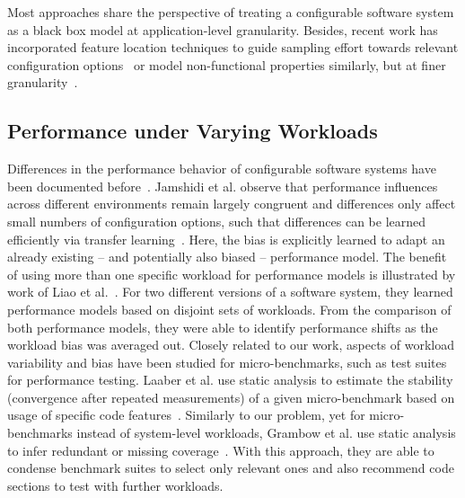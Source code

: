 Most approaches share the perspective of treating a configurable software system as a black box model at application-level granularity. Besides, recent work has incorporated feature location techniques to guide sampling effort towards relevant configuration options~\cite{velez_2020_configcrusher_jase,velez_comprex_2021} or model non-functional properties similarly, but at finer granularity~\cite{weber_white_2021}.

\subsection{Performance under Varying Workloads}
Differences in the performance behavior of configurable software systems have been documented before~\cite{jamishidi_transfer_2017,alves_sampling_2020}. Jamshidi et al. observe that performance influences across different environments remain largely congruent and differences only affect small numbers of configuration options, such that differences can be learned efficiently via transfer learning~\cite{jamishidi_transfer_2017,jamshidi_learning_2018,jamshidi_transfer_gp_2017,ding_bayesian_2020}. Here, the bias is explicitly learned to adapt an already existing – and potentially also biased -- performance model. The benefit of using more than one specific workload for performance models is illustrated by work of Liao et al.~\cite{liao_2020_using_emse}. For two different versions of a software system, they learned performance models based on disjoint sets of workloads. From the comparison of both performance models, they were able to identify performance shifts as the workload bias was averaged out.
Closely related to our work, aspects of workload variability and bias have been studied for micro-benchmarks, such as test suites for performance testing. Laaber et al. use static analysis to estimate the stability (convergence after repeated measurements) of a given micro-benchmark based on usage of specific code features~\cite{laaber_emse_2021}. Similarly to our problem, yet for micro-benchmarks instead of system-level workloads, Grambow et al. use static analysis to infer redundant or missing coverage~\cite{grambow_peerj_2021}. With this approach, they are able to condense benchmark suites to select only relevant ones and also recommend code sections to test with further workloads.


